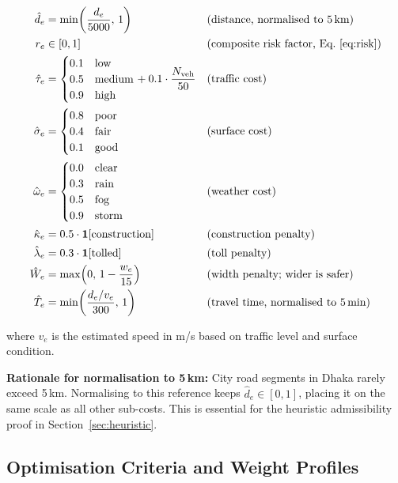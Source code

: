 ﻿\documentclass[a4paper, 12pt]{article}
\theoremstyle{remark}
\begin{document}
\begin{align}
\hat{d}_e &= \min\!\left(\frac{d_e}{5000},\, 1\right) & &\text{(distance, normalised to 5\,km)} \label{eq:dist_norm}\\
r_e       &\in [0,1]                                   & &\text{(composite risk factor, Eq.~\ref{eq:risk})} \\
\hat{\tau}_e &= \begin{cases}0.1 & \text{low}\\ 0.5 & \text{medium}\\ 0.9 & \text{high}\end{cases} + 0.1\cdot\frac{N_{\text{veh}}}{50} & &\text{(traffic cost)} \\
\hat{\sigma}_e &= \begin{cases}0.8 & \text{poor}\\ 0.4 & \text{fair}\\ 0.1 & \text{good}\end{cases} & &\text{(surface cost)} \\
\hat{\omega}_e &= \begin{cases}0.0 & \text{clear}\\ 0.3 & \text{rain}\\ 0.5 & \text{fog}\\ 0.9 & \text{storm}\end{cases} & &\text{(weather cost)} \\
\hat{\kappa}_e &= 0.5\cdot\mathbf{1}[\text{construction}] & &\text{(construction penalty)} \\
\hat{\lambda}_e &= 0.3\cdot\mathbf{1}[\text{tolled}] & &\text{(toll penalty)} \\
\hat{W}_e &= \max\!\left(0,\, 1 - \frac{w_e}{15}\right) & &\text{(width penalty; wider is safer)} \\
\hat{T}_e &= \min\!\left(\frac{d_e / v_e}{300},\, 1\right) & &\text{(travel time, normalised to 5\,min)}
\end{align}

where $v_e$ is the estimated speed in m/s based on traffic level and surface condition.

\textbf{Rationale for normalisation to 5\,km:} City road segments in Dhaka rarely exceed 5\,km. Normalising to this reference keeps $\hat{d}_e \in [0,1]$, placing it on the same scale as all other sub-costs. This is essential for the heuristic admissibility proof in Section~\ref{sec:heuristic}.

\subsection{Optimisation Criteria and Weight Profiles}
\end{document}

